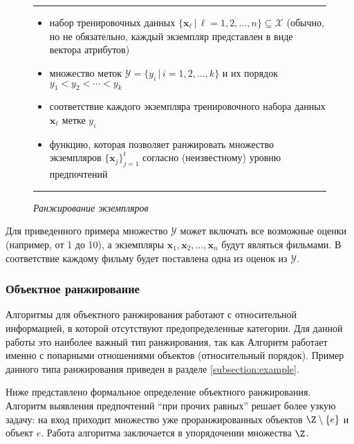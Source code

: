 	\begin{figure}[h!]
		\hrule
		\begin{description}[nosep]
			\item[Дано:] \null\leavevmode
			\begin{itemize}[itemsep=0pt,leftmargin=2ex,label=\textbf{---}]
				\item набор тренировочных данных $\{\bm{x}_\ell \, | \, \ell = 1,2,\dots,n\} \subseteq \mathcal{X} $ (обычно, но не обязательно, каждый экземпляр представлен в виде вектора атрибутов)
				\item множество меток $\mathcal{Y} = \{y_i\,|\,i = 1,2,\dotsc,k\}$ и их порядок $y_1 < y_2 < \dotsb < y_k$ 
				\item соответствие каждого экземпляра тренировочного набора данных $\bm{x}_\ell$ метке $y_{i}$
			\end{itemize}
			\item[Найти:] \null\leavevmode
			\begin{itemize}[itemsep=0pt,leftmargin=2ex,label=\textbf{---}]
				\item функцию, которая позволяет ранжировать множество экземпляров $\{\bm{x}_j\}^t_{j=1}$ согласно (неизвестному) уровню предпочтений
			\end{itemize}
		\end{description} 
		\hrule
		\caption*{\textit{Ранжирование экземпляров}\cite[с.~6]{plbook:Introduction:2010}}
		\label{fig:instance_ranking}
	\end{figure}
	Для приведенного примера множество $\mathcal{Y}$ может включать все возможные оценки (например, от 1 до 10), а экземпляры $\bm{x}_1, \bm{x}_2, \dots, \bm{x}_n$ будут являться фильмами. В соответствие каждому фильму будет поставлена одна из оценок из $\mathcal{Y}$.
	
	\subsubsection{Объектное ранжирование}
	Алгоритмы для объектного ранжирования работают с 
	относительной %
	информацией, в которой отсутствуют предопределенные категории. Для данной работы это наиболее важный тип ранжирования, так как  Алгоритм работает именно с попарными отношениями объектов (относительный порядок). Пример данного типа ранжирования приведен в разделе \ref{subsection:example}.
	
	Ниже представлено формальное определение объектного ранжирования. Алгоритм выявления предпочтений \enquote{при прочих равных} решает более узкую задачу: на вход приходит множество уже проранжированных объектов $\Z \setminus \{e\}$ и объект $e$. Работа алгоритма заключается в упорядочении множества $\Z$.
	

